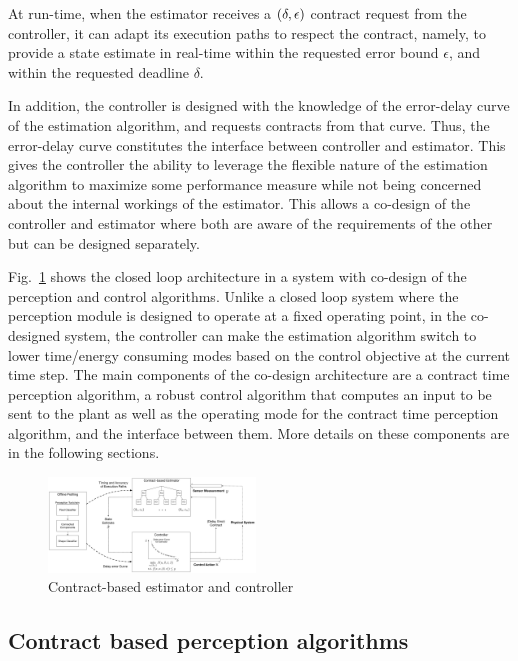 At run-time, when the estimator receives a $(\delta,\epsilon)$ contract request from the controller, it can adapt its execution paths to respect the contract, namely, to provide a state estimate in real-time within the requested error bound $\epsilon$, and within the requested deadline $\delta$.

In addition, the controller is designed with the knowledge of the error-delay curve of the estimation algorithm, and requests contracts from that curve.
Thus, the error-delay curve constitutes the interface between controller and estimator.
This gives the controller the ability to leverage the flexible nature of the estimation algorithm to maximize some performance measure while not being concerned about the internal workings of the estimator.
This allows a co-design of the controller and estimator where both are aware of the requirements of the other but can be designed separately.

Fig.~\ref{fig:fullcodesignedCE} shows the closed loop architecture in a system with co-design of the perception and control algorithms.
Unlike a closed loop system where the perception module is designed to operate at a fixed operating point, in the co-designed system, the controller can make the estimation algorithm switch to lower time/energy consuming modes based on the control objective at the current time step.
The main components of the co-design architecture are a contract time perception algorithm, a robust control algorithm that computes an input to be sent to the plant as well as the operating mode for the contract time perception algorithm, and the interface between them. More details on these components are in the following sections.

\begin{figure}[t]
	\centering
	\includegraphics[width=0.49\textwidth]{figures/omnigraffle_figures/process_figure}
	\caption{Contract-based estimator and controller}
	\label{fig:fullcodesignedCE}
\end{figure}
\subsection{Contract based perception algorithms}

